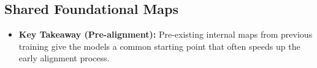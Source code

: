 
\subsection{Shared Foundational Maps}
\begin{itemize}
     \item \textbf{Key Takeaway (Pre-alignment):} Pre-existing internal maps from previous training give the models a common starting point that often speeds up the early alignment process.
 \end{itemize}

